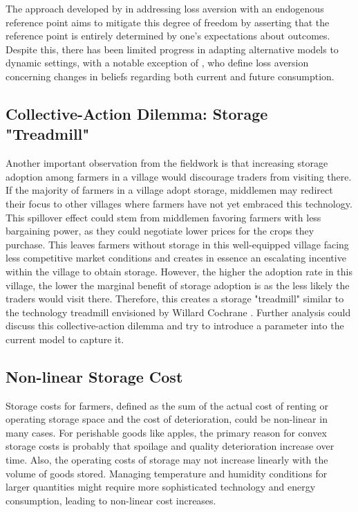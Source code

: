 The approach developed by \cite{kHoszegi2006model, kHoszegi2007reference, kHoszegi2009reference} in addressing loss aversion with an endogenous reference point aims to mitigate this degree of freedom by asserting that the reference point is entirely determined by one's expectations about outcomes. Despite this, there has been limited progress in adapting alternative models to dynamic settings, with a notable exception of \cite{kHoszegi2009reference}, who define loss aversion concerning changes in beliefs regarding both current and future consumption.



\subsection{Collective-Action Dilemma: Storage "Treadmill"}
\noindent Another important observation from the fieldwork is that increasing storage adoption among farmers in a village would discourage traders from visiting there. If the majority of farmers in a village adopt storage, middlemen may redirect their focus to other villages where farmers have not yet embraced this technology. This spillover effect could stem from middlemen favoring farmers with less bargaining power, as they could negotiate lower prices for the crops they purchase. This leaves farmers without storage in this well-equipped village facing less competitive market conditions and creates in essence an escalating incentive within the village to obtain storage. However, the higher the adoption rate in this village, the lower the marginal benefit of storage adoption is as the less likely the traders would visit there. Therefore, this creates a storage "treadmill" similar to the technology treadmill envisioned by Willard Cochrane \citep{levins1996treadmill, cochrane1958farm}. Further analysis could discuss this collective-action dilemma and try to introduce a parameter into the current model to capture it.


\subsection{Non-linear Storage Cost}
\noindent Storage costs for farmers, defined as the sum of the actual cost of renting or operating storage space and the cost of deterioration, could be non-linear in many cases. For perishable goods like apples, the primary reason for convex storage costs is probably that spoilage and quality deterioration increase over time. Also, the operating costs of storage may not increase linearly with the volume of goods stored. Managing temperature and humidity conditions for larger quantities might require more sophisticated technology and energy consumption, leading to non-linear cost increases.


